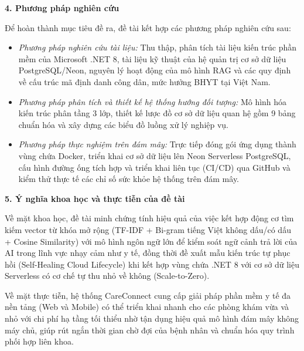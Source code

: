 \textbf{4. Phương pháp nghiên cứu}

Để hoàn thành mục tiêu đề ra, đề tài kết hợp các phương pháp nghiên cứu sau:
\begin{itemize}
    \item \textit{Phương pháp nghiên cứu tài liệu:} Thu thập, phân tích tài liệu kiến trúc phần mềm của Microsoft .NET 8, tài liệu kỹ thuật của hệ quản trị cơ sở dữ liệu PostgreSQL/Neon, nguyên lý hoạt động của mô hình RAG và các quy định về cấu trúc mã định danh công dân, mức hưởng BHYT tại Việt Nam.
    \item \textit{Phương pháp phân tích và thiết kế hệ thống hướng đối tượng:} Mô hình hóa kiến trúc phân tầng 3 lớp, thiết kế lược đồ cơ sở dữ liệu quan hệ gồm 9 bảng chuẩn hóa và xây dựng các biểu đồ luồng xử lý nghiệp vụ.
    \item \textit{Phương pháp thực nghiệm trên đám mây:} Trực tiếp đóng gói ứng dụng thành vùng chứa Docker, triển khai cơ sở dữ liệu lên Neon Serverless PostgreSQL, cấu hình đường ống tích hợp và triển khai liên tục (CI/CD) qua GitHub và kiểm thử thực tế các chỉ số sức khỏe hệ thống trên đám mây.
\end{itemize}

\textbf{5. Ý nghĩa khoa học và thực tiễn của đề tài}

Về mặt khoa học, đề tài minh chứng tính hiệu quả của việc kết hợp động cơ tìm kiếm vector từ khóa mở rộng (TF-IDF + Bi-gram tiếng Việt không dấu/có dấu + Cosine Similarity) với mô hình ngôn ngữ lớn để kiểm soát ngữ cảnh trả lời của AI trong lĩnh vực nhạy cảm như y tế, đồng thời đề xuất mẫu kiến trúc tự phục hồi (Self-Healing Cloud Lifecycle) khi kết hợp vùng chứa .NET 8 với cơ sở dữ liệu Serverless có cơ chế tự thu nhỏ về không (Scale-to-Zero).

Về mặt thực tiễn, hệ thống CareConnect cung cấp giải pháp phần mềm y tế đa nền tảng (Web và Mobile) có thể triển khai nhanh cho các phòng khám vừa và nhỏ với chi phí hạ tầng tối thiểu nhờ tận dụng hiệu quả mô hình đám mây không máy chủ, giúp rút ngắn thời gian chờ đợi của bệnh nhân và chuẩn hóa quy trình phối hợp liên khoa.
